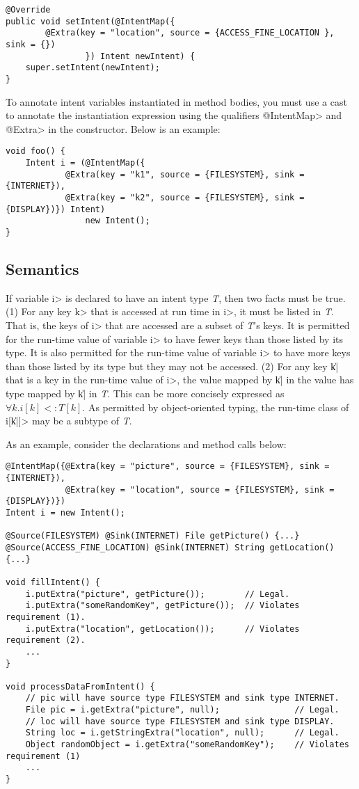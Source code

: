 \begin{Verbatim}
@Override
public void setIntent(@IntentMap({
        @Extra(key = "location", source = {ACCESS_FINE_LOCATION }, sink = {})
                }) Intent newIntent) {
    super.setIntent(newIntent);
}
\end{Verbatim}

To annotate intent variables instantiated in method bodies, you must use a cast
to annotate the instantiation expression using the qualifiers \<@IntentMap> and
\<@Extra> in the constructor. Below is an example:

\begin{Verbatim}
void foo() {
    Intent i = (@IntentMap({
            @Extra(key = "k1", source = {FILESYSTEM}, sink = {INTERNET}),
            @Extra(key = "k2", source = {FILESYSTEM}, sink = {DISPLAY})}) Intent)
                new Intent();
}
\end{Verbatim}


\subsection{Semantics}
If variable \<i> is declared to have an intent type \textit{T}, then two facts must be
true. (1) For any key \<k> that is accessed at run time in \<i>, it must be
listed in \textit{T}. That is, the keys of \<i> that are accessed are
a subset of \textit{T}'s keys. It is
permitted for the run-time value of variable \<i> to have fewer keys than those
listed by its type. It is also permitted for the run-time value of variable
\<i> to have more keys than those listed by its type but they may not be
accessed. (2) For any key \|k| that is a key in the run-time value of \<i>,
the value mapped by \|k| in the value has type mapped by \|k| in \textit{T}. 
This can be more concisely expressed as $\forall k.i[k] <: T[k]$. As permitted
by object-oriented typing, the run-time class of \<i[\|k|]> may be a subtype of \textit{T}.

As an example, consider the declarations and method calls below:

\begin{Verbatim}
@IntentMap({@Extra(key = "picture", source = {FILESYSTEM}, sink = {INTERNET}),
            @Extra(key = "location", source = {FILESYSTEM}, sink = {DISPLAY})}) 
Intent i = new Intent();

@Source(FILESYSTEM) @Sink(INTERNET) File getPicture() {...}
@Source(ACCESS_FINE_LOCATION) @Sink(INTERNET) String getLocation() {...}

void fillIntent() {
    i.putExtra("picture", getPicture());        // Legal.
    i.putExtra("someRandomKey", getPicture());  // Violates requirement (1).
    i.putExtra("location", getLocation());      // Violates requirement (2).
    ...
}

void processDataFromIntent() {
    // pic will have source type FILESYSTEM and sink type INTERNET.
    File pic = i.getExtra("picture", null);               // Legal.
    // loc will have source type FILESYSTEM and sink type DISPLAY.
    String loc = i.getStringExtra("location", null);      // Legal.
    Object randomObject = i.getExtra("someRandomKey");    // Violates requirement (1)
    ...
}
\end{Verbatim}

